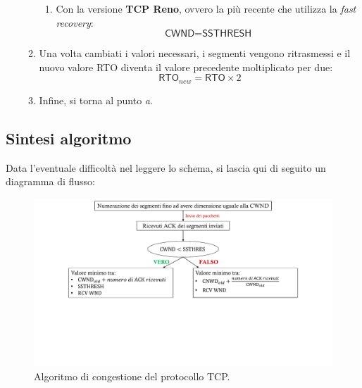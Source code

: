 \documentclass[a4paper]{article}
\begin{document}
\begin{enumerate}
\begin{enumerate}
\begin{enumerate}
				\item Con la versione \textbf{TCP Reno}, ovvero la più recente che utilizza la \emph{fast recovery}:
				\begin{equation*}
					\textsf{CWND} = \textsf{SSTHRESH}
				\end{equation*}
			\end{enumerate}
			
			\item Una volta cambiati i valori necessari, i segmenti vengono ritrasmessi e il nuovo valore RTO diventa il valore precedente moltiplicato per due:
			\begin{equation*}
				\textsf{RTO}_{new} = \textsf{RTO} \times 2
			\end{equation*}
			
			\item Infine, si torna al punto \emph{a}.
		\end{enumerate}
	\end{enumerate}
	\newpage
	
	\subsection{Sintesi algoritmo}
	
	Data l'eventuale difficoltà nel leggere lo schema, si lascia qui di seguito un diagramma di flusso:
	\begin{figure}[!htp]
		\centering
		\includegraphics[width=\textwidth]{img/algoritmo_congestione_TCP.pdf}
		\caption{Algoritmo di congestione del protocollo TCP.}
	\end{figure}
	
\end{document}
